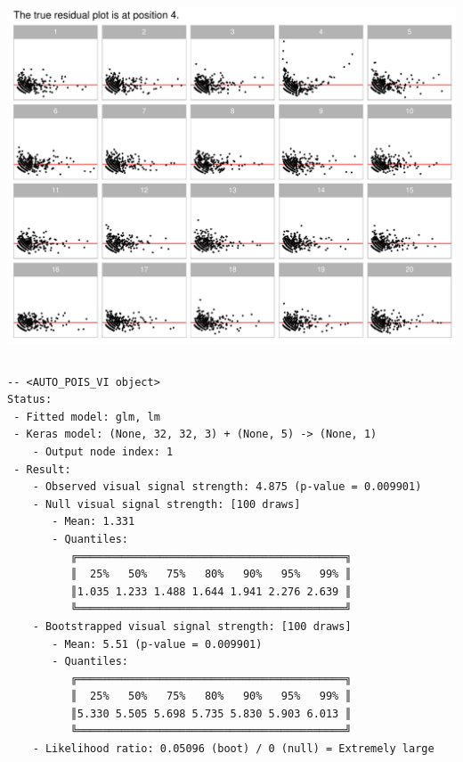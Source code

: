 \documentclass[
doublespace,
  times]{anzsauth}
\newenvironment{Shaded}{\begin{snugshade}}{\end{snugshade}}
\newcommand{\FunctionTok}[1]{\textcolor[rgb]{0.28,0.35,0.67}{#1}}
\newcommand{\NormalTok}[1]{\textcolor[rgb]{0.00,0.23,0.31}{#1}}
\newcommand{\SpecialCharTok}[1]{\textcolor[rgb]{0.37,0.37,0.37}{#1}}
\begin{document}
\begin{center}
\includegraphics[width=1\textwidth,height=\textheight]{autovi_paper_files/figure-pdf/unnamed-chunk-7-1.pdf}
\end{center}

\begin{Shaded}
\end{Shaded}

\begin{verbatim}
\end{verbatim}

\begin{verbatim}
-- <AUTO_POIS_VI object>
Status:
 - Fitted model: glm, lm
 - Keras model: (None, 32, 32, 3) + (None, 5) -> (None, 1)
    - Output node index: 1
 - Result:
    - Observed visual signal strength: 4.875 (p-value = 0.009901)
    - Null visual signal strength: [100 draws]
       - Mean: 1.331
       - Quantiles: 
          ╔══════════════════════════════════════════╗
          ║  25%   50%   75%   80%   90%   95%   99% ║
          ║1.035 1.233 1.488 1.644 1.941 2.276 2.639 ║
          ╚══════════════════════════════════════════╝
    - Bootstrapped visual signal strength: [100 draws]
       - Mean: 5.51 (p-value = 0.009901)
       - Quantiles: 
          ╔══════════════════════════════════════════╗
          ║  25%   50%   75%   80%   90%   95%   99% ║
          ║5.330 5.505 5.698 5.735 5.830 5.903 6.013 ║
          ╚══════════════════════════════════════════╝
    - Likelihood ratio: 0.05096 (boot) / 0 (null) = Extremely large 
\end{verbatim}
\end{document}
